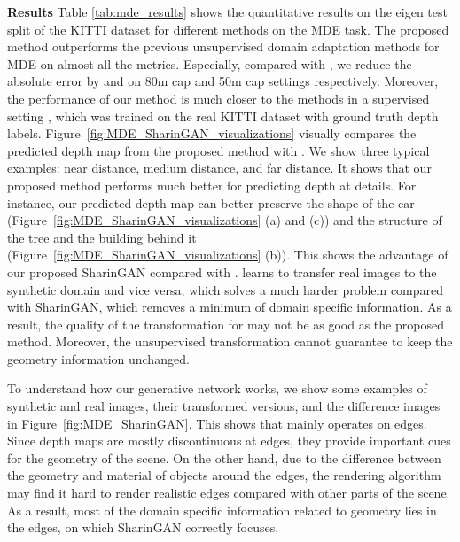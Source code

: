 \documentclass[10pt,twocolumn,letterpaper]{article}
\begin{document}
\textbf{Results}
Table \ref{tab:mde_results} shows the quantitative results on the eigen test split of the KITTI dataset for different methods on the MDE task. 
The proposed method outperforms the previous unsupervised domain adaptation methods for MDE \cite{GASDA,T2NET} on almost all the metrics.
Especially, compared with \cite{GASDA}, we reduce the absolute error by  and  on 80m cap and 50m cap settings respectively.
Moreover, the performance of our method is much closer to the methods in a supervised setting \cite{Eigen2014,Fayao,Kuznietsov_2017_CVPR}, which was trained on the real KITTI dataset with ground truth depth labels. 
Figure~\ref{fig:MDE_SharinGAN_visualizations} visually compares the predicted depth map from the proposed method with \cite{GASDA}.
We show three typical examples: near distance, medium distance, and far distance.
It shows that our proposed method performs much better for predicting depth at details.
For instance, our predicted depth map can better preserve the shape of the car (Figure~\ref{fig:MDE_SharinGAN_visualizations} (a) and (c)) and the structure of the tree and the building behind it (Figure~\ref{fig:MDE_SharinGAN_visualizations} (b)). 
This shows the advantage of our proposed SharinGAN compared with \cite{GASDA}.
\cite{GASDA} learns to transfer real images to the synthetic domain and vice versa, which solves a much harder problem compared with SharinGAN, which removes a minimum of domain specific information.
As a result, the quality of the transformation for \cite{GASDA} may not be as good as the proposed method.
Moreover, the unsupervised transformation cannot guarantee to keep the geometry information unchanged.

To understand how our generative network  works, we show some examples of synthetic and real images, their transformed versions, and the difference images in Figure~\ref{fig:MDE_SharinGAN}.
This shows that  mainly operates on edges.
Since depth maps are mostly discontinuous at edges, they provide important cues for the geometry of the scene.
On the other hand, due to the difference between the geometry and material of objects around the edges, the rendering algorithm may find it hard to render realistic edges compared with other parts of the scene.
As a result, most of the domain specific information related to geometry lies in the edges, on which SharinGAN correctly focuses.
\end{document}
